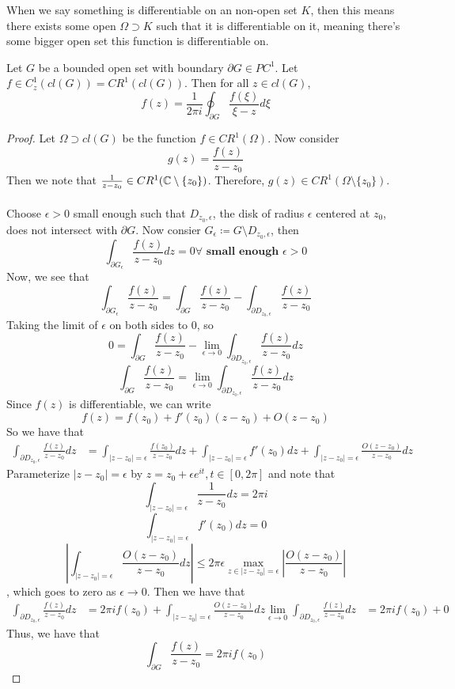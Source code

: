 \documentclass{article}
\begin{document}
When we say something is differentiable on an non-open set $K$, then this means there exists some open $\Omega \supset K$ such that it is differentiable on it, meaning there's some bigger open set this function is differentiable on.

\begin{theorem}
Let $G$ be a bounded open set with boundary $\partial G \in PC^1$. Let $f \in C^1_z(cl(G)) = CR^1(cl(G))$. Then for all $z \in cl(G)$,
\[f(z) = \frac{1}{2 \pi i} \oint_{\partial G} \frac{f(\xi)}{\xi - z} d\xi\]
\end{theorem}

\begin{proof}
Let $\Omega \supset cl(G)$ be the function $f \in CR^1(\Omega)$. Now consider
\[g(z) = \frac{f(z)}{z - z_0}\]
Then we note that $\frac{1}{z - z_0} \in CR^1(\mathbb{C} \setminus \{z_0\})$. Therefore, $g(z) \in CR^1(\Omega \setminus \{z_0\})$.\\\\
Choose $\epsilon > 0$ small enough such that $D_{z_0, \epsilon}$, the disk of radius $\epsilon$ centered at $z_0$, does not intersect with $\partial G$. Now consier $G_\epsilon \coloneqq G \setminus D_{z_0, \epsilon}$, then
\[\int_{\partial G_\epsilon} \frac{f(z)}{z - z_0} dz = 0 \forall \textbf{ small enough } \epsilon > 0\]
Now, we see that
\[\int_{\partial G_\epsilon} \frac{f(z)}{z - z_0} = \int_{\partial G} \frac{f(z)}{z - z_0} - \int_{\partial D_{z_0, \epsilon}} \frac{f(z)}{z - z_0}\]
Taking the limit of $\epsilon$ on both sides to $0$, so
\[0 = \int_{\partial G} \frac{f(z)}{z - z_0} - \lim_{\epsilon \to 0} \int_{\partial D_{z_0, \epsilon}}\frac{f(z)}{z - z_0} dz \]
\[\int_{\partial G} \frac{f(z)}{z - z_0} = \lim_{\epsilon \to 0} \int_{\partial D_{z_0, \epsilon}}\frac{f(z)}{z - z_0} dz\]
Since $f(z)$ is differentiable, we can write
\[f(z) = f(z_0) + f'(z_0) (z - z_0) + O(z - z_0)\]
So we have that
\begin{align*}
  \int_{\partial D_{z_0, \epsilon}}\frac{f(z)}{z - z_0} dz
  &= \int_{ |z - z_0| = \epsilon} \frac{f(z_0)}{z - z_0} dz + \int_{ |z - z_0| = \epsilon} f'(z_0) dz + \int_{ |z - z_0| = \epsilon} \frac{O(z - z_0)}{z - z_0} dz
\end{align*}
Parameterize $|z - z_0| = \epsilon$ by $z = z_0 + \epsilon e^{it}, t \in [0, 2\pi]$ and note that
\[\int_{|z - z_0| = \epsilon} \frac{1}{z - z_0} dz = 2 \pi i\]
\[\int_{ |z - z_0| = \epsilon} f'(z_0) dz = 0\]
\[|\int_{ |z - z_0| = \epsilon} \frac{O(z - z_0)}{z - z_0} dz| \leq 2 \pi \epsilon \max_{z \in |z - z_0| = \epsilon} |\frac{O(z - z_0)}{z - z_0}|\]
, which goes to zero as $\epsilon \to 0$. Then we have that
\begin{align*}
  \int_{\partial D_{z_0, \epsilon}}\frac{f(z)}{z - z_0} dz
  &= 2\pi i f(z_0) + \int_{ |z - z_0| = \epsilon} \frac{O(z - z_0)}{z - z_0} dz
  \lim_{\epsilon \to 0} \int_{\partial D_{z_0, \epsilon}}\frac{f(z)}{z - z_0} dz &= 2\pi i f(z_0) + 0
\end{align*}
Thus, we have that
\[\int_{\partial G} \frac{f(z)}{z - z_0} = 2\pi i f(z_0)\]
\end{proof}
\end{document}
